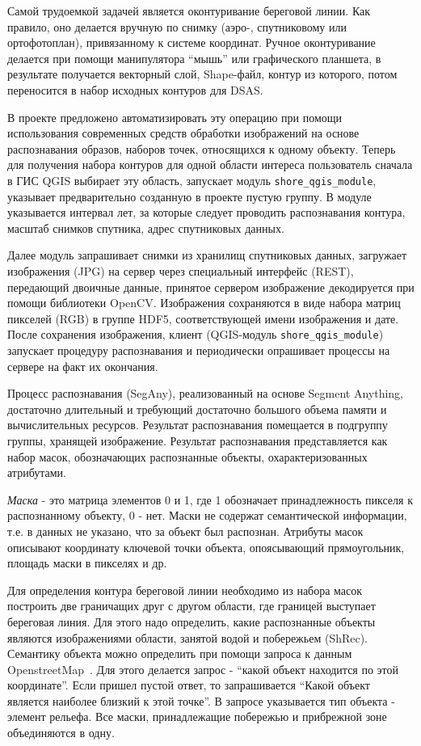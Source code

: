 \documentclass[732,fontsize=14pt,final]{studrep}
\begin{document}
Самой трудоемкой задачей является оконтуривание береговой линии. Как правило, оно делается вручную по снимку (аэро-, спутниковому или ортофотоплан), привязанному к системе координат. Ручное оконтуривание делается при помощи манипулятора “мышь” или графического планшета, в результате получается векторный слой, Shape-файл, контур из которого, потом переносится в набор исходных контуров для DSAS.

В проекте предложено автоматизировать эту операцию при помощи использования современных средств обработки изображений на основе распознавания образов, наборов точек, относящихся к одному объекту. Теперь для получения набора контуров для одной области интереса пользователь сначала в ГИС QGIS выбирает эту область, запускает модуль \verb|shore_qgis_module|, указывает предварительно созданную в проекте пустую группу. В модуле указывается интервал лет, за которые следует проводить распознавания контура, масштаб снимков спутника, адрес спутниковых данных.

Далее модуль запрашивает снимки из хранилищ спутниковых данных, загружает изображения (JPG) на сервер через специальный интерфейс (REST), передающий двоичные данные, принятое сервером изображение декодируется при помощи библиотеки OpenCV. Изображения сохраняются в виде набора матриц пикселей (RGB) в группе HDF5, соответствующей имени изображения и дате. После сохранения изображения, клиент (QGIS-модуль \verb|shore_qgis_module|) запускает процедуру распознавания и периодически опрашивает процессы на сервере на факт их окончания.

Процесс распознавания (SegAny), реализованный на основе Segment Anything, достаточно длительный и требующий достаточно большого объема памяти и вычислительных ресурсов. Результат распознавания помещается в подгруппу группы, хранящей изображение. Результат распознавания представляется как набор масок, обозначающих распознанные объекты, охарактеризованных атрибутами. 

\emph{Маска} - это матрица элементов 0 и 1, где 1 обозначает принадлежность пикселя к распознанному объекту, 0 - нет. Маски не содержат семантической информации, т.е. в данных не указано, что за объект был распознан. Атрибуты масок описывают координату ключевой точки объекта, опоясывающий прямоугольник, площадь маски в пикселях и др.

Для определения контура береговой линии необходимо из набора масок построить две граничащих друг с другом области, где границей выступает береговая линия. Для этого надо определить, какие распознанные объекты являются изображениями области, занятой водой и побережьем (ShRec). Семантику объекта можно определить при помощи запроса к данным OpenstreetMap~\cite{osm}. Для этого делается запрос - “какой объект находится по этой координате”. Если пришел пустой ответ, то запрашивается “Какой объект является наиболее близкий к этой точке”. В запросе указывается тип объекта - элемент рельефа. Все маски, принадлежащие побережью и прибрежной зоне объединяются в одну.
\end{document}

